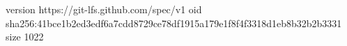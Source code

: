 version https://git-lfs.github.com/spec/v1
oid sha256:41bce1b2ed3edf6a7cdd8729ce78df1915a179e1f8f4f3318d1eb8b32b2b3331
size 1022
